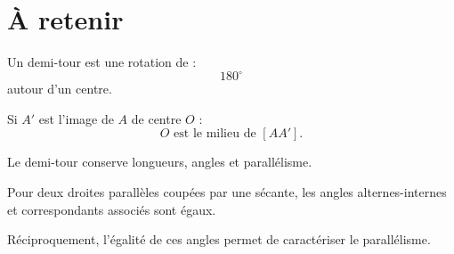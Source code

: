 \section{À retenir}

\begin{aretenir}
Un demi-tour est une rotation de :
\[
\boxed{180^\circ}
\]
autour d'un centre.

Si $A'$ est l'image de $A$ de centre $O$ :
\[
\boxed{O\text{ est le milieu de }[AA']}.
\]

Le demi-tour conserve longueurs, angles et parallélisme.

Pour deux droites parallèles coupées par une sécante, les angles alternes-internes et correspondants associés sont égaux.

Réciproquement, l'égalité de ces angles permet de caractériser le parallélisme.
\end{aretenir}
